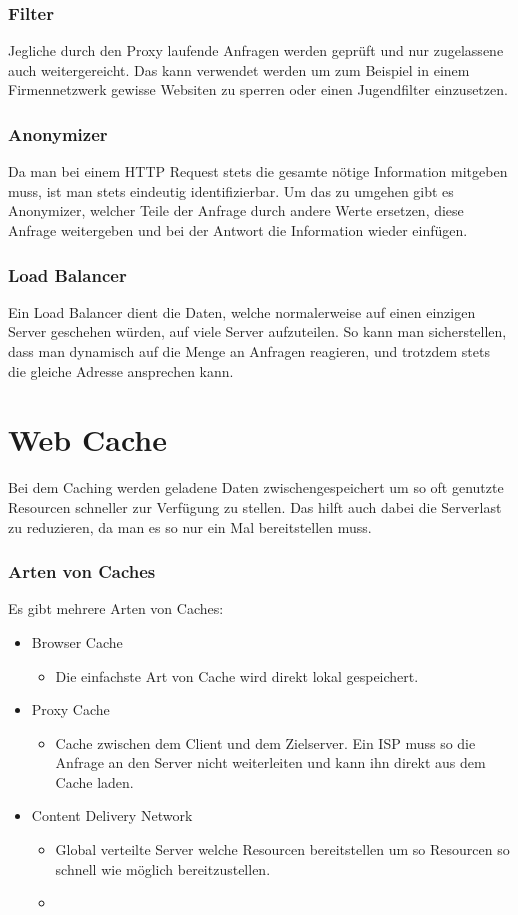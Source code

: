 \documentclass{article}
\begin{document}
\begin{itemize}
	\subsubsection{Filter}
	Jegliche durch den Proxy laufende Anfragen werden geprüft und nur zugelassene auch weitergereicht. Das kann verwendet werden um zum Beispiel in einem Firmennetzwerk gewisse Websiten zu sperren oder einen Jugendfilter einzusetzen.
	\subsubsection{Anonymizer}
	Da man bei einem HTTP Request stets die gesamte nötige Information mitgeben muss, ist man stets eindeutig identifizierbar. Um das zu umgehen gibt es Anonymizer, welcher Teile der Anfrage durch andere Werte ersetzen, diese Anfrage weitergeben und bei der Antwort die Information wieder einfügen.
	\subsubsection{Load Balancer}
	Ein Load Balancer dient die Daten, welche normalerweise auf einen einzigen Server geschehen würden, auf viele Server aufzuteilen. So kann man sicherstellen, dass man dynamisch auf die Menge an Anfragen reagieren, und trotzdem stets die gleiche Adresse ansprechen kann.
	\section{Web Cache}
	Bei dem Caching werden geladene Daten zwischengespeichert um so oft genutzte Resourcen schneller zur Verfügung zu stellen. Das hilft auch dabei die Serverlast zu reduzieren, da man es so nur ein Mal bereitstellen muss.
	\subsubsection{Arten von Caches}
	Es gibt mehrere Arten von Caches:
	\begin{itemize}
		\item{Browser Cache}
		\begin{itemize}
			\item{Die einfachste Art von Cache wird direkt lokal gespeichert.}
		\end{itemize}
		\item{Proxy Cache}
		\begin{itemize}
			\item{Cache zwischen dem Client und dem Zielserver. Ein ISP muss so die Anfrage an den Server nicht weiterleiten und kann ihn direkt aus dem Cache laden.}
		\end{itemize}
		\item{Content Delivery Network}
		\begin{itemize}
			\item{Global verteilte Server welche Resourcen bereitstellen um so Resourcen so schnell wie möglich bereitzustellen.}
			\item{}
		\end{itemize}
	\end{itemize}

\end{itemize}
\end{document}
